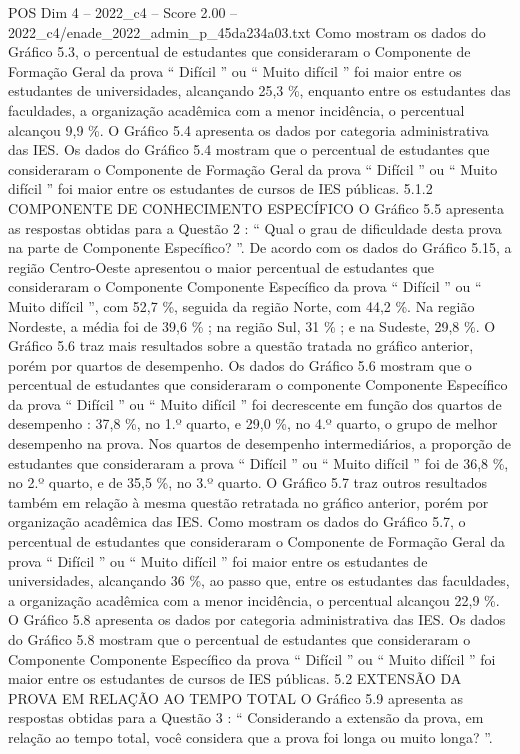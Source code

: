 \begin{textsample}{POS Dim 4 – 2022\_c4 – Score 2.00 – 2022\_c4/enade\_2022\_admin\_p\_45da234a03.txt}
Como mostram os dados do Gráfico 5.3, o percentual de estudantes que consideraram o Componente de Formação Geral da prova “ Difícil ” ou “ Muito difícil ” foi maior entre os estudantes de universidades, alcançando 25,3 \%, enquanto entre os estudantes das faculdades, a organização acadêmica com a menor incidência, o percentual alcançou 9,9 \%.
O Gráfico 5.4 apresenta os dados por categoria administrativa das IES.
Os dados do Gráfico 5.4 mostram que o percentual de estudantes que consideraram o Componente de Formação Geral da prova “ Difícil ” ou “ Muito difícil ” foi maior entre os estudantes de cursos de IES públicas. 5.1.2 COMPONENTE DE CONHECIMENTO ESPECÍFICO O Gráfico 5.5 apresenta as respostas obtidas para a Questão 2 : “ Qual o grau de dificuldade desta prova na parte de Componente Específico? ”.
De acordo com os dados do Gráfico 5.15, a região Centro-Oeste apresentou o maior percentual de estudantes que consideraram o Componente Componente Específico da prova “ Difícil ” ou “ Muito difícil ”, com 52,7 \%, seguida da região Norte, com 44,2 \%.
Na região Nordeste, a média foi de 39,6 \% ; na região Sul, 31 \% ; e na Sudeste, 29,8 \%.
O Gráfico 5.6 traz mais resultados sobre a questão tratada no gráfico anterior, porém por quartos de desempenho.
Os dados do Gráfico 5.6 mostram que o percentual de estudantes que consideraram o componente Componente Específico da prova “ Difícil ” ou “ Muito difícil ” foi decrescente em função dos quartos de desempenho : 37,8 \%, no 1.º quarto, e 29,0 \%, no 4.º quarto, o grupo de melhor desempenho na prova.
Nos quartos de desempenho intermediários, a proporção de estudantes que consideraram a prova “ Difícil ” ou “ Muito difícil ” foi de 36,8 \%, no 2.º quarto, e de 35,5 \%, no 3.º quarto.
O Gráfico 5.7 traz outros resultados também em relação à mesma questão retratada no gráfico anterior, porém por organização acadêmica das IES.
Como mostram os dados do Gráfico 5.7, o percentual de estudantes que consideraram o Componente de Formação Geral da prova “ Difícil ” ou “ Muito difícil ” foi maior entre os estudantes de universidades, alcançando 36 \%, ao passo que, entre os estudantes das faculdades, a organização acadêmica com a menor incidência, o percentual alcançou 22,9 \%.
O Gráfico 5.8 apresenta os dados por categoria administrativa das IES.
Os dados do Gráfico 5.8 mostram que o percentual de estudantes que consideraram o Componente Componente Específico da prova “ Difícil ” ou “ Muito difícil ” foi maior entre os estudantes de cursos de IES públicas. 5.2 EXTENSÃO DA PROVA EM RELAÇÃO AO TEMPO TOTAL O Gráfico 5.9 apresenta as respostas obtidas para a Questão 3 : “ Considerando a extensão da prova, em relação ao tempo total, você considera que a prova foi longa ou muito longa? ”.

\end{textsample}
